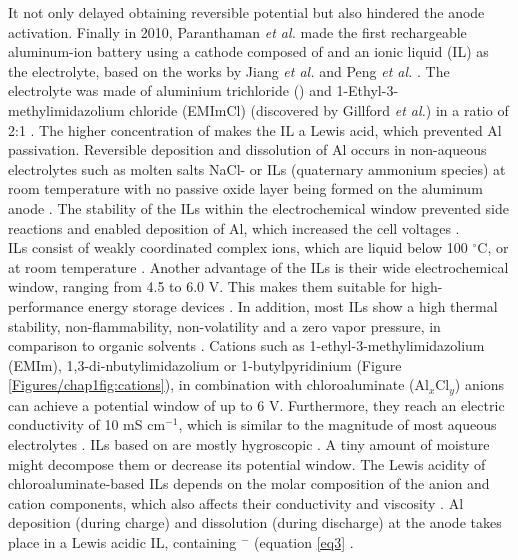 It not only delayed obtaining reversible potential but also hindered the anode activation. Finally in 2010, Paranthaman \textit{et al.} made the first rechargeable aluminum-ion battery using a cathode composed of  and an ionic liquid (IL) as the electrolyte, based on the works by Jiang \textit{et al.} and Peng \textit{et al.} \cite{paranthaman_transformational_2010, jiang_electrodeposition_2006,peng_investigation_2008}. 
The electrolyte was made of aluminium trichloride () and 1-Ethyl-3-methylimidazolium chloride (EMImCl) (discovered by Gillford \textit{et al.}) in a ratio of 2:1 \cite{gifford_aluminum/chlorine_1988}. The higher concentration of  makes the IL a Lewis acid, which prevented Al passivation. 
Reversible deposition and dissolution of Al occurs in non-aqueous electrolytes such as molten salts NaCl- or ILs (quaternary ammonium species) at room temperature with no passive oxide layer being formed on the aluminum anode \cite{vestergaard_molten_1993,galinski_ionic_2006,elia_insights_2017}. The stability of the ILs within the electrochemical window prevented side reactions and enabled deposition of Al, which increased the cell voltages \cite{li_aluminum_2002}.\\ ILs consist of weakly coordinated complex ions, which are liquid below 100 $^{\circ}$C, or at room temperature \cite{hayes_structure_2015}. Another advantage of the ILs is their wide electrochemical window, ranging from 4.5 to 6.0 V. This makes them suitable for high-performance energy storage devices \cite{wang_binder-free_2015}. In addition, most ILs show a high thermal stability, non-flammability, non-volatility and a zero vapor pressure, in comparison to organic solvents \cite{dieter}. Cations such as 1-ethyl-3-methylimidazolium (EMIm), 1,3-di-nbutylimidazolium or 1-butylpyridinium (Figure \ref{Figures/chap1fig:cations}), in combination with chloroaluminate (Al$_x$Cl$_y$) anions can achieve a potential window of up to 6 V. Furthermore, they reach an electric conductivity of 10 mS cm$^{-1}$, which is similar to the magnitude of most aqueous electrolytes \cite{ngo_thermal_2000}. ILs based on  are mostly hygroscopic \cite{ueda_electroplating_2012}. A tiny amount of moisture might decompose them or decrease its potential window. The Lewis acidity of chloroaluminate-based ILs depends on the molar composition of the anion and cation components, which also affects their conductivity and viscosity \cite{buzzeo_non-haloaluminate_2004}. 
Al deposition (during charge) and dissolution (during discharge) at the anode takes place in a Lewis acidic IL, containing $^-$ (equation \ref{eq3} \cite{galinski_ionic_2006}.

